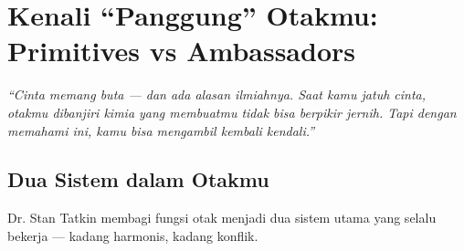 \chapter{Kenali ``Panggung'' Otakmu: Primitives vs Ambassadors}

\begin{insightbox}
\textit{``Cinta memang buta --- dan ada alasan ilmiahnya. Saat kamu jatuh cinta, otakmu dibanjiri kimia yang membuatmu tidak bisa berpikir jernih. Tapi dengan memahami ini, kamu bisa mengambil kembali kendali.''}
\end{insightbox}

\section{Dua Sistem dalam Otakmu}

Dr. Stan Tatkin membagi fungsi otak menjadi dua sistem utama yang selalu bekerja --- kadang harmonis, kadang konflik.

